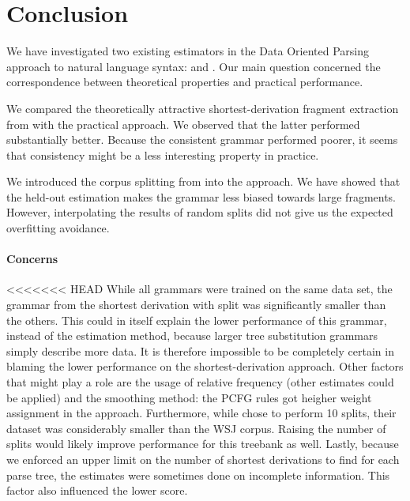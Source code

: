 \section{Conclusion}

We have investigated two existing estimators in the Data Oriented Parsing approach to natural language syntax: \ddop{} and \dops. Our main question concerned the correspondence between theoretical properties and practical performance. 

We compared the theoretically attractive shortest-derivation fragment extraction from \dops{} with the practical \ddop{} approach. 
We observed that the latter performed substantially better. Because the consistent grammar performed poorer, it seems that consistency might be a less interesting property in practice.

We introduced the corpus splitting from \dops{} into the \ddop{} approach.  We have showed that the held-out estimation makes the grammar less biased towards large fragments. However, interpolating the results of random splits did not give us the expected overfitting avoidance. 

\paragraph{Concerns}
<<<<<<< HEAD
While all grammars were trained on the same data set, the grammar from the shortest derivation with split was significantly smaller than the others. This could in itself explain the lower performance of this grammar, instead of the estimation method, because larger tree substitution grammars simply describe more data. It is therefore impossible to be completely certain in blaming the lower performance on the shortest-derivation approach. 
Other factors that might play a role are the usage of relative frequency (other estimates could be applied) and the smoothing method: the PCFG rules got heigher weight assignment in the \ddop{} approach.
Furthermore, while \cite{zollman2005} chose to perform 10 splits, their dataset was considerably smaller than the WSJ corpus. Raising the number of splits would likely improve performance for this treebank as well.
Lastly, because we enforced an upper limit on the number of shortest derivations to find for each parse tree, the estimates were sometimes done on incomplete information. This factor also influenced the lower score.


